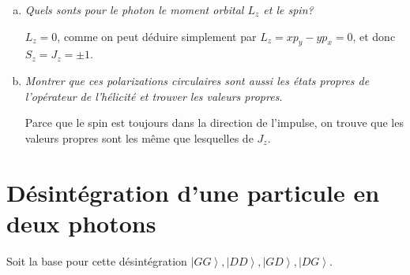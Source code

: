 \documentclass[10pt]{report}
\newcommand{\ket}[1]{\left|#1\right>}
\begin{document}
\begin{enumerate}[a)]
        Donc pour les rotations infinit\'esmales on trouve (en mettant sa matrice dans \eqref{08.10.eq})
        \begin{align}
            J_z &= \begin{bmatrix} 0 & -i\hbar & 0\\i\hbar & 0 & 0\\0 & 0 & 0 \end{bmatrix} 
        \end{align}

        Les valeurs propres sont donc $\pm \hbar, 0$. Les fonctions propres sont respectivement les polarizations circulaire gauche et droite. La derni\`ere fonction propre est $\vec{\epsilon} \propto \hat{z}$ mais \c{c}a ne satisfait pas les \'equations de Maxwell.

        La consequence de tout \c{c}a c'est que pour les particules avec masse nulle n'ont jamais spin nulle; c'est interdit dans les \'equations de Maxwell. Donc, m\^eme s'il y a en g\'en\'erale trois degr\'es de libert\'e pour une particule avec spin $1$, c'est seulement deux pour les particules avec masse nulle.

    \item \emph{Quels sonts pour le photon le moment orbital $L_z$ et le spin?}

        $L_z = 0$, comme on peut d\'eduire simplement par $L_z = xp_y - yp_x = 0$, et donc $S_z = J_z = \pm 1$. 

    \item \emph{Montrer que ces polarizations circulaires sont aussi les \'etats propres de l'op\'erateur de l'h\'elicit\'e et trouver les valeurs propres.}

        Parce que le spin est toujours dans la direction de l'impulse, on trouve que les valeurs propres sont les m\^eme que lesquelles de $J_z$. 
\end{enumerate}

\section{D\'esint\'egration d'une particule en deux photons}

Soit la base pour cette d\'esint\'egration $\ket{GG},\ket{DD},\ket{GD},\ket{DG}$. 
\end{document}
